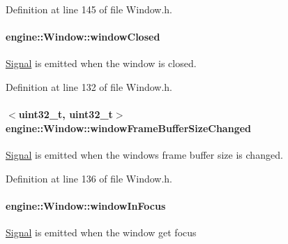 Definition at line 145 of file Window.\+h.

\paragraph[{\texorpdfstring{window\+Closed}{windowClosed}}]{ engine\+::\+Window\+::window\+Closed\hspace{0.3cm}{\ttfamily [inherited]}}\hypertarget{a00082_a5bb494c228eb398d6893327fcf03d2d3}{}\label{a00082_a5bb494c228eb398d6893327fcf03d2d3}
\hyperlink{a00065}{Signal} is emitted when the window is closed. 

Definition at line 132 of file Window.\+h.

\paragraph[{\texorpdfstring{window\+Frame\+Buffer\+Size\+Changed}{windowFrameBufferSizeChanged}}]{$<$uint32\+\_\+t, uint32\+\_\+t$>$ engine\+::\+Window\+::window\+Frame\+Buffer\+Size\+Changed\hspace{0.3cm}{\ttfamily [inherited]}}\hypertarget{a00082_a0c6ef7abcac1063c91a84123c81f9347}{}\label{a00082_a0c6ef7abcac1063c91a84123c81f9347}
\hyperlink{a00065}{Signal} is emitted when the window\textquotesingle{}s frame buffer size is changed. 

Definition at line 136 of file Window.\+h.

\paragraph[{\texorpdfstring{window\+In\+Focus}{windowInFocus}}]{ engine\+::\+Window\+::window\+In\+Focus\hspace{0.3cm}{\ttfamily [inherited]}}\hypertarget{a00082_a2a81dc83b5e8433eb39e1ca8263d0c0f}{}\label{a00082_a2a81dc83b5e8433eb39e1ca8263d0c0f}
\hyperlink{a00065}{Signal} is emitted when the window get focus 

